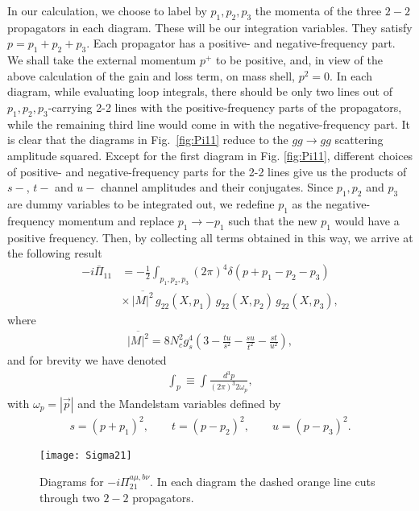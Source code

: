 \documentclass[onecolumn,showpacs,nobibnotes,nofootinbib,12pt,aps,prd,showpacs,notitlepage,nofootinbib,preprintnumbers,amsmath,amssymb]{article}
\def\fig#1{{Fig.~\ref{#1}}}
\begin{document}
In our calculation, we choose to label by $p_1,p_2,p_3$ the momenta of
the three $2-2$ propagators in each diagram. These will be our
integration variables. They satisfy $p=p_1+p_2+p_3$. Each propagator
has a positive- and negative-frequency part. We shall take the
external momentum $p^+$ to be positive, and, in view of the above
calculation of the gain and loss term, on mass shell, $p^2 =0$. In
each diagram, while evaluating loop integrals, there should be only
two lines out of $p_1,p_2,p_3$-carrying 2-2 lines with the
positive-frequency parts of the propagators, while the remaining third
line would come in with the negative-frequency part. It is clear that
the diagrams in \fig{fig:Pi11} reduce to the $gg \to gg$ scattering
amplitude squared.  Except for the first diagram in
Fig. \ref{fig:Pi11}, different choices of positive- and
negative-frequency parts for the 2-2 lines give us the products of
$s-$, $t-$ and $u-$ channel amplitudes and their conjugates. Since
$p_1, p_2$ and $p_3$ are dummy variables to be integrated out, we
redefine $p_1$ as the negative-frequency momentum and replace $p_1 \to
- p_1$ such that the new $p_1$ would have a positive frequency. Then,
by collecting all terms obtained in this way, we arrive at the
following result
\begin{align}
  -i\bar{\Pi}_{11}&=-\frac{1}{2}\int_{p_1,p_2,p_3} (2\pi)^4
  \delta(p+p_1-p_2-p_3)
 \nonumber\\
 &\times 
\, \overline{|M|^2} \,
  g_{22}(X,p_1) \, g_{22}(X,p_2) \, g_{22}(X,p_3),
  \label{eq:Pi11}
\end{align}
where
\begin{align}
  \overline{|M|^2}= 8 N_c^2 g_s^4 \left(3-\frac{t u}{s^2}-\frac{s
      u}{t^2}-\frac{s t}{u^2}\right),\label{eq:Msgggg}
\end{align}
and for brevity we have denoted
\begin{align}
\int_p\equiv\int\frac{d^3 p}{(2\pi)^3 2 \omega_{p}},
\end{align}
with $\omega_{p} = |{\vec p}|$ and the Mandelstam variables defined by
\begin{align}
  s=(p+p_1)^2,\qquad t=(p-p_2)^2,\qquad u=(p-p_3)^2.
\end{align}

\begin{figure}[htb]
\begin{center}
\texttt{[image: Sigma21]}
\end{center}
\caption[*]{Diagrams for $-i \Pi_{21}^{a\mu,b\nu}$. In each diagram the
  dashed orange line cuts through two $2-2$ propagators.}
\label{fig:Pi21}
\end{figure}
\end{document}
